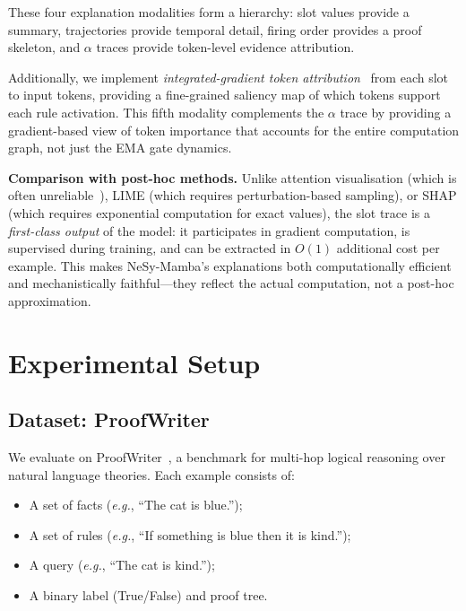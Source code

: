 \documentclass[conference]{IEEEtran}
\DeclareRobustCommand{\model}{NeSy-Mamba}
\newcommand{\eg}{\textit{e.g.}}
\begin{document}
These four explanation modalities form a hierarchy: slot values
provide a summary, trajectories provide temporal detail, firing
order provides a proof skeleton, and $\alpha$ traces provide
token-level evidence attribution.

Additionally, we implement \emph{integrated-gradient token
attribution}~\cite{sundararajan2017ig} from each slot to input
tokens, providing a fine-grained saliency map of which tokens
support each rule activation.  This fifth modality complements the
$\alpha$ trace by providing a gradient-based view of token
importance that accounts for the entire computation graph, not
just the EMA gate dynamics.

\textbf{Comparison with post-hoc methods.}
Unlike attention visualisation (which is often
unreliable~\cite{jain2019attention}), LIME (which requires
perturbation-based sampling), or SHAP (which requires exponential
computation for exact values), the slot trace is a
\emph{first-class output} of the model: it participates in
gradient computation, is supervised during training, and can be
extracted in $O(1)$ additional cost per example.  This makes
\model{}'s explanations both computationally efficient and
mechanistically faithful---they reflect the actual computation,
not a post-hoc approximation.


\section{Experimental Setup}
\label{sec:experiments}

\subsection{Dataset: ProofWriter}
\label{sec:dataset}

We evaluate on ProofWriter~\cite{tafjord2021proofwriter}, a
benchmark for multi-hop logical reasoning over natural language
theories.  Each example consists of:
\begin{itemize}[nosep]
    \item A set of facts (\eg{}, ``The cat is blue.'');
    \item A set of rules (\eg{}, ``If something is blue then it
          is kind.'');
    \item A query (\eg{}, ``The cat is kind.'');
    \item A binary label (True/False) and proof tree.
\end{itemize}
\end{document}
